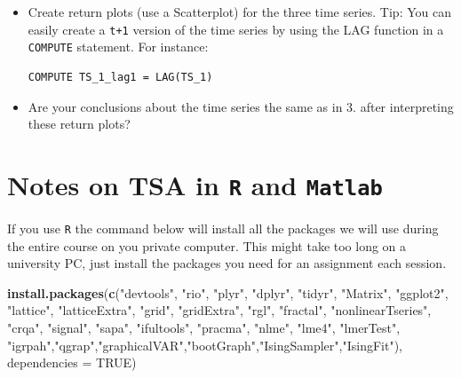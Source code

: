 \documentclass[]{book}
\newenvironment{Shaded}{\begin{snugshade}}{\end{snugshade}}
\newcommand{\KeywordTok}[1]{\textcolor[rgb]{0.13,0.29,0.53}{\textbf{{#1}}}}
\newcommand{\DataTypeTok}[1]{\textcolor[rgb]{0.13,0.29,0.53}{{#1}}}
\newcommand{\StringTok}[1]{\textcolor[rgb]{0.31,0.60,0.02}{{#1}}}
\newcommand{\OtherTok}[1]{\textcolor[rgb]{0.56,0.35,0.01}{{#1}}}
\newcommand{\NormalTok}[1]{{#1}}
\let\stdsection\section
\renewcommand\section{\newpage\stdsection}
\begin{document}
\begin{enumerate}
  \begin{itemize}
  \item
    Create return plots (use a Scatterplot) for the three time series.
    Tip: You can easily create a \texttt{t+1} version of the time series
    by using the LAG function in a \texttt{COMPUTE} statement. For
    instance:

\begin{verbatim}
COMPUTE TS_1_lag1 = LAG(TS_1)
\end{verbatim}
  \item
    Are your conclusions about the time series the same as in 3. after
    interpreting these return plots?
  \end{itemize}
\end{enumerate}

\section{\texorpdfstring{Notes on TSA in \texttt{R} and
\texttt{Matlab}}{Notes on TSA in R and Matlab}}\label{notes-on-tsa-in-r-and-matlab}

If you use \texttt{R} the command below will install all the packages we
will use during the entire course on you private computer. This might
take too long on a university PC, just install the packages you need for
an assignment each session.

\begin{Shaded}
\begin{Highlighting}[]
\KeywordTok{install.packages}\NormalTok{(}\KeywordTok{c}\NormalTok{(}\StringTok{"devtools"}\NormalTok{, }\StringTok{"rio"}\NormalTok{, }\StringTok{"plyr"}\NormalTok{, }\StringTok{"dplyr"}\NormalTok{, }\StringTok{"tidyr"}\NormalTok{, }\StringTok{"Matrix"}\NormalTok{, }
                   \StringTok{"ggplot2"}\NormalTok{, }\StringTok{"lattice"}\NormalTok{, }\StringTok{"latticeExtra"}\NormalTok{, }\StringTok{"grid"}\NormalTok{, }\StringTok{"gridExtra"}\NormalTok{, }\StringTok{"rgl"}\NormalTok{,}
                   \StringTok{"fractal"}\NormalTok{,  }\StringTok{"nonlinearTseries"}\NormalTok{,  }\StringTok{"crqa"}\NormalTok{, }
                   \StringTok{"signal"}\NormalTok{, }\StringTok{"sapa"}\NormalTok{, }\StringTok{"ifultools"}\NormalTok{, }\StringTok{"pracma"}\NormalTok{, }
                   \StringTok{"nlme"}\NormalTok{, }\StringTok{"lme4"}\NormalTok{, }\StringTok{"lmerTest"}\NormalTok{,}
                   \StringTok{"igrpah"}\NormalTok{,}\StringTok{"qgrap"}\NormalTok{,}\StringTok{"graphicalVAR"}\NormalTok{,}\StringTok{"bootGraph"}\NormalTok{,}\StringTok{"IsingSampler"}\NormalTok{,}\StringTok{"IsingFit"}\NormalTok{),}
                 \DataTypeTok{dependencies =} \OtherTok{TRUE}\NormalTok{)}
\end{Highlighting}
\end{Shaded}
\end{document}
